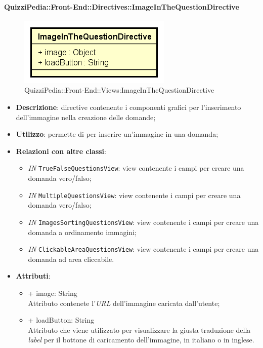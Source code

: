 \paragraph{QuizziPedia::Front-End::Directives::ImageInTheQuestionDirective}
\begin{figure} [ht]
	\centering
	\includegraphics[scale=0.80]{UML/Classi/Front-End/QuizziPedia_Front-end_ImageInTheQuestionDirective.png}
	\caption{QuizziPedia::Front-End::Views:ImageInTheQuestionDirective}
\end{figure} \FloatBarrier
\begin{itemize}
	\item \textbf{Descrizione}: directive contenente i componenti grafici per l'inserimento dell'immagine nella creazione delle domande;
	\item \textbf{Utilizzo}: permette di per inserire un'immagine in una domanda;
	\item \textbf{Relazioni con altre classi}:
	\begin{itemize}
		\item \textit{IN} \texttt{TrueFalseQuestionsView}: view contenente i campi per creare una domanda vero/falso; 
		\item \textit{IN} \texttt{MultipleQuestionsView}:  view contenente i campi per creare una domanda vero/falso; 
		\item \textit{IN} \texttt{ImagesSortingQuestionsView}: view contenente i campi per creare una domanda a ordinamento immagini;
		\item \textit{IN} \texttt{ClickableAreaQuestionsView}:  view contenente i campi per creare una domanda ad area cliccabile.
	\end{itemize}
	\item \textbf{Attributi}:
	\begin{itemize}
		\item {+ image: String} \\ Attributo contenete l'\textit{URL} dell'immagine caricata dall'utente;
		\item {+ loadButton: String} \\ Attributo che viene utilizzato per visualizzare la giusta traduzione della \textit{label} per il bottone di caricamento dell'immagine, in italiano o in inglese. 
	\end{itemize}
\end{itemize}
